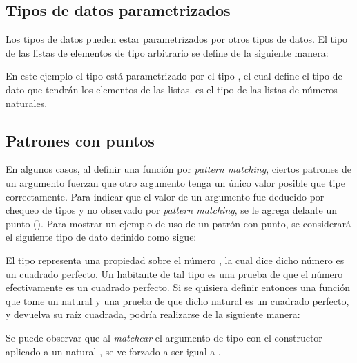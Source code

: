 \subsection{Tipos de datos parametrizados}\label{tipos:parametrized}

Los tipos de datos pueden estar parametrizados por otros tipos de datos. El tipo de las listas de elementos de tipo arbitrario se define de la siguiente manera:


En este ejemplo el tipo  está parametrizado por el tipo , el cual define el tipo de dato que tendrán los elementos de las listas.   es el tipo de las listas de números naturales. 


\subsection{Patrones con puntos}\label{tipos:puntos}

En algunos casos, al definir una función por \textit{pattern matching}, ciertos patrones de un argumento fuerzan que otro argumento tenga un único valor posible que tipe correctamente. Para indicar que el valor de un argumento fue deducido por chequeo de tipos y no observado por \textit{pattern matching},  se le agrega delante un punto (). Para mostrar un ejemplo de uso de un patrón con punto, se considerará el siguiente tipo de dato  definido como sigue:


El tipo   representa una propiedad sobre el número , la cual dice
dicho número es un cuadrado perfecto. Un habitante de tal tipo es una prueba de que el número  efectivamente es un cuadrado perfecto. Si se quisiera definir entonces una función  que tome un natural y una prueba de que dicho natural es un cuadrado perfecto, y devuelva su raíz cuadrada, podría realizarse de la siguiente manera:


Se puede observar que al \textit{matchear} el argumento de tipo   con el constructor  aplicado a un natural ,  se ve forzado a ser igual a  \AgdaFunction{*} .


